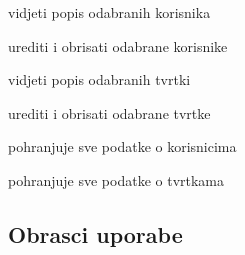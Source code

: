 \begin{packed_enum}
				\begin{packed_enum}

					\item vidjeti popis odabranih korisnika
					\item urediti i obrisati odabrane korisnike
					\item vidjeti popis odabranih tvrtki
					\item urediti i obrisati odabrane tvrtke
						
				\end{packed_enum}
				
				\item  {}
				
				\begin{packed_enum}
					
					\item pohranjuje sve podatke o korisnicima
					\item pohranjuje sve podatke o tvrtkama
				
				\end{packed_enum}
			\end{packed_enum}
\eject 
				
			\subsection{Obrasci uporabe}
				
